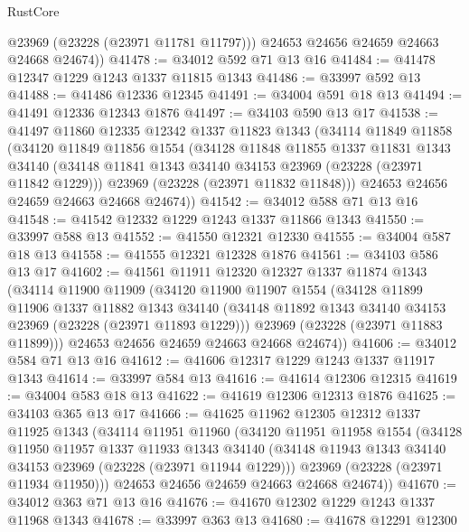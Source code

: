 \begin{lexlean}{RustCore}
\begin{coremodule}
          @23969
          (@23228 (@23971 @11781 @11797)))
        @24653
        @24656
        @24659
        @24663
        @24668
        @24674))
@41478 := @34012 @592 @71 @13 @16
@41484 := @41478 @12347 @1229 @1243 @1337 @11815 @1343
@41486 := @33997 @592 @13
@41488 := @41486 @12336 @12345
@41491 := @34004 @591 @18 @13
@41494 := @41491 @12336 @12343 @1876
@41497 := @34103 @590 @13 @17
@41538 := @41497
    @11860
    @12335
    @12342
    @1337
    @11823
    @1343
    (@34114
      @11849
      @11858
      (@34120
        @11849
        @11856
        @1554
        (@34128
          @11848
          @11855
          @1337
          @11831
          @1343
          @34140
          (@34148 @11841 @1343 @34140 @34153 @23969 (@23228 (@23971 @11842 @1229)))
          @23969
          (@23228 (@23971 @11832 @11848)))
        @24653
        @24656
        @24659
        @24663
        @24668
        @24674))
@41542 := @34012 @588 @71 @13 @16
@41548 := @41542 @12332 @1229 @1243 @1337 @11866 @1343
@41550 := @33997 @588 @13
@41552 := @41550 @12321 @12330
@41555 := @34004 @587 @18 @13
@41558 := @41555 @12321 @12328 @1876
@41561 := @34103 @586 @13 @17
@41602 := @41561
    @11911
    @12320
    @12327
    @1337
    @11874
    @1343
    (@34114
      @11900
      @11909
      (@34120
        @11900
        @11907
        @1554
        (@34128
          @11899
          @11906
          @1337
          @11882
          @1343
          @34140
          (@34148 @11892 @1343 @34140 @34153 @23969 (@23228 (@23971 @11893 @1229)))
          @23969
          (@23228 (@23971 @11883 @11899)))
        @24653
        @24656
        @24659
        @24663
        @24668
        @24674))
@41606 := @34012 @584 @71 @13 @16
@41612 := @41606 @12317 @1229 @1243 @1337 @11917 @1343
@41614 := @33997 @584 @13
@41616 := @41614 @12306 @12315
@41619 := @34004 @583 @18 @13
@41622 := @41619 @12306 @12313 @1876
@41625 := @34103 @365 @13 @17
@41666 := @41625
    @11962
    @12305
    @12312
    @1337
    @11925
    @1343
    (@34114
      @11951
      @11960
      (@34120
        @11951
        @11958
        @1554
        (@34128
          @11950
          @11957
          @1337
          @11933
          @1343
          @34140
          (@34148 @11943 @1343 @34140 @34153 @23969 (@23228 (@23971 @11944 @1229)))
          @23969
          (@23228 (@23971 @11934 @11950)))
        @24653
        @24656
        @24659
        @24663
        @24668
        @24674))
@41670 := @34012 @363 @71 @13 @16
@41676 := @41670 @12302 @1229 @1243 @1337 @11968 @1343
@41678 := @33997 @363 @13
@41680 := @41678 @12291 @12300

\end{coremodule}
\end{lexlean}
